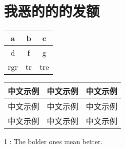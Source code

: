 \chapter{我恶的的的发额}
\linespacing{18pt}
\zhlipsum[10-13]




\begin{table*}[htb]
\small
\centering
{}
\begin{tabular}{ccc}
\toprule
a   & b  & c   \\\midrule
d   & f  & g   \\
rgr & tr & tre \\
\bottomrule
\end{tabular}
\end{table*}



\zhlipsum[10-11]

\begin{table*}[htb]
\small
\centering
{}
\begin{threeparttable}
\begin{tabular}{lll}
\toprule
中文示例   & 中文示例  & 中文示例   \\\midrule
中文示例   & 中文示例  & 中文示例\tnote{1}   \\
中文示例 & 中文示例 & 中文示例 \\
\bottomrule
\end{tabular}
\begin{tablenotes}
\item [1]: The bolder ones mean better.
\end{tablenotes}
\end{threeparttable}
\end{table*}